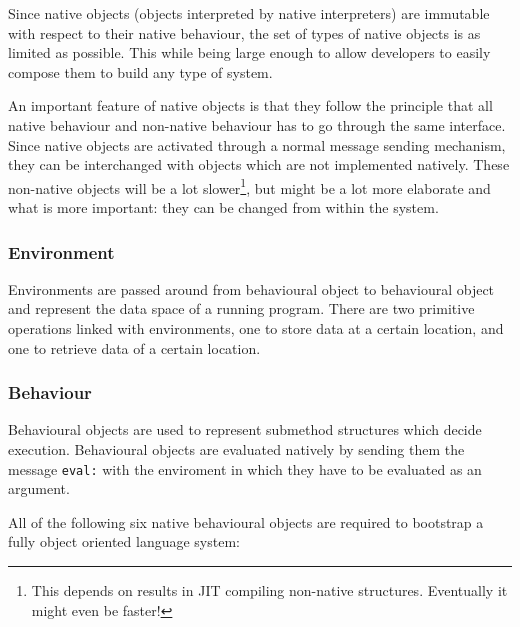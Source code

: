 \documentclass{article}
\begin{document}
Since native objects (objects interpreted by native interpreters) are
immutable with respect to their native behaviour, the set of types of native
objects is as limited as possible. This while being large enough to allow
developers to easily compose them to build any type of system. 

An important feature of native objects is that they follow the principle that
all native behaviour and non-native behaviour has to go through the same
interface. Since native objects are activated through a normal message sending
mechanism, they can be interchanged with objects which are not implemented
natively. These non-native objects will be a lot slower\footnote{This depends
on results in JIT compiling non-native structures. Eventually it might even be
faster!}, but might be a lot more elaborate and what is more important: they
can be changed from within the system.

\subsubsection{Environment}
Environments are passed around from behavioural object to behavioural object
and represent the data space of a running program. There are two primitive
operations linked with environments, one to store data at a certain location,
and one to retrieve data of a certain location.

\subsubsection{Behaviour}
Behavioural objects are used to represent submethod structures which decide
execution. Behavioural objects are evaluated natively by sending them the
message \verb$eval:$ with the enviroment in which they have to be evaluated as
an argument.

All of the following six native behavioural objects are required to bootstrap
a fully object oriented language system:
\end{document}
